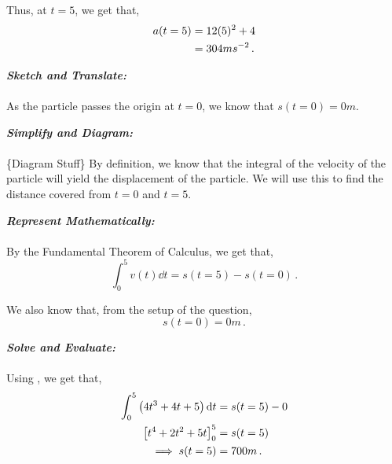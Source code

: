 \begin{subquestions}
\begin{subsubquestions}
Thus, at $t=5$, we get that,
\begin{align}
	a(t=5) & = 12(5)^2 + 4 \nonumber \\
	       & = 304 ms^{-2} \,.
\end{align}


\subsubquestion

\textbf{\textit{Sketch and Translate:}} \\ \\
As the particle passes the origin at $t=0$, we know that $s(t=0) = 0m$.




\textbf{\textit{Simplify and Diagram:}} \\ \\
\{Diagram Stuff\}
By definition, we know that the integral of the velocity of the particle will yield the displacement of the particle. We will use this to find the distance covered from $t=0$ and $t=5$.




\textbf{\textit{Represent Mathematically:}} \\ \\
By  the Fundamental Theorem of Calculus, we get that,
\begin{equation}
	\int_{0}^{5} v(t) \dd t = s(t=5)-s(t=0) \label{2005:q5:FTC1} \,.
\end{equation}

We also know that, from the setup of the question,
\begin{equation}
	s(t=0) = 0m \,.
\end{equation}




\textbf{\textit{Solve and Evaluate:}} \\ \\
Using , we get that,
\begin{align}
	\int_{0}^{5} \left(4t^3+4t+5\right) \mathrm{d} t & = s(t=5)-0 \nonumber \\
	\left[t^4+2t^2+5t\right]^5_0 & = s(t=5) \nonumber \\
	\implies s(t=5) & = 700m \,.
\end{align}

\end{subsubquestions}



\end{subquestions}
